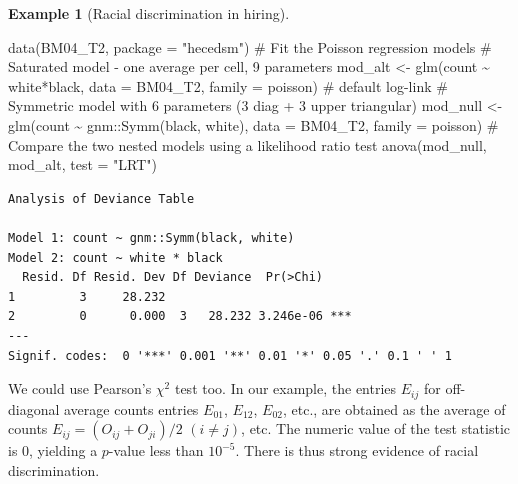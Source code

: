 \documentclass[
  11pt,
  letterpaper,
]{scrbook}
\newenvironment{Shaded}{\begin{snugshade}}{\end{snugshade}}
\newcommand{\AttributeTok}[1]{\textcolor[rgb]{0.40,0.45,0.13}{#1}}
\newcommand{\CommentTok}[1]{\textcolor[rgb]{0.37,0.37,0.37}{#1}}
\newcommand{\ConstantTok}[1]{\textcolor[rgb]{0.56,0.35,0.01}{#1}}
\newcommand{\FunctionTok}[1]{\textcolor[rgb]{0.28,0.35,0.67}{#1}}
\newcommand{\NormalTok}[1]{\textcolor[rgb]{0.00,0.23,0.31}{#1}}
\newcommand{\OtherTok}[1]{\textcolor[rgb]{0.00,0.23,0.31}{#1}}
\newcommand{\SpecialCharTok}[1]{\textcolor[rgb]{0.37,0.37,0.37}{#1}}
\newcommand{\StringTok}[1]{\textcolor[rgb]{0.13,0.47,0.30}{#1}}
\theoremstyle{definition}
\theoremstyle{definition}
\newtheorem{example}{Example}[chapter]
\theoremstyle{remark}
\begin{document}
\begin{example}[Racial discrimination in
hiring]
\begin{Shaded}
\begin{Highlighting}[]
\FunctionTok{data}\NormalTok{(BM04\_T2, }\AttributeTok{package =} \StringTok{"hecedsm"}\NormalTok{)}
\CommentTok{\# Fit the Poisson regression models}
\CommentTok{\# Saturated model {-} one average per cell, 9 parameters }
\NormalTok{mod\_alt }\OtherTok{\textless{}{-}} \FunctionTok{glm}\NormalTok{(count }\SpecialCharTok{\textasciitilde{}}\NormalTok{ white}\SpecialCharTok{*}\NormalTok{black, }
             \AttributeTok{data =}\NormalTok{ BM04\_T2, }
             \AttributeTok{family =}\NormalTok{ poisson) }\CommentTok{\# default log{-}link}
\CommentTok{\# Symmetric model with 6 parameters (3 diag + 3 upper triangular)}
\NormalTok{mod\_null }\OtherTok{\textless{}{-}} \FunctionTok{glm}\NormalTok{(count }\SpecialCharTok{\textasciitilde{}}\NormalTok{ gnm}\SpecialCharTok{::}\FunctionTok{Symm}\NormalTok{(black, white), }
                \AttributeTok{data =}\NormalTok{ BM04\_T2, }
                \AttributeTok{family =}\NormalTok{ poisson)}
\CommentTok{\# Compare the two nested models using a likelihood ratio test}
\FunctionTok{anova}\NormalTok{(mod\_null, mod\_alt,  }\AttributeTok{test =} \StringTok{"LRT"}\NormalTok{)}
\end{Highlighting}
\end{Shaded}

\begin{verbatim}
Analysis of Deviance Table

Model 1: count ~ gnm::Symm(black, white)
Model 2: count ~ white * black
  Resid. Df Resid. Dev Df Deviance  Pr(>Chi)    
1         3     28.232                          
2         0      0.000  3   28.232 3.246e-06 ***
---
Signif. codes:  0 '***' 0.001 '**' 0.01 '*' 0.05 '.' 0.1 ' ' 1
\end{verbatim}

\begin{Shaded}
\end{Shaded}

We could use Pearson's \(\chi^2\) test too. In our example, the entries
\(E_{ij}\) for off-diagonal average counts entries \(E_{01}\),
\(E_{12}\), \(E_{02}\), etc., are obtained as the average of counts
\(E_{ij} = (O_{ij} + O_{ji})/2\) \((i\neq j)\), etc. The numeric value
of the test statistic is 0, yielding a \(p\)-value less than
\(10^{-5}\). There is thus strong evidence of racial discrimination.


\end{example}
\end{document}

